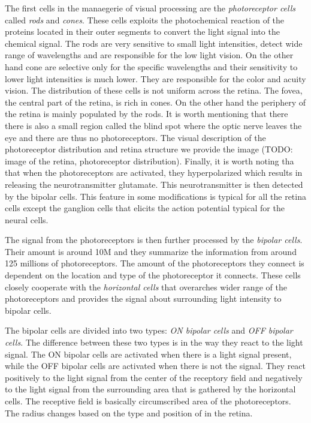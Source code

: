 The first cells in the manaegerie of visual processing are the \emph{photoreceptor cells}
called \emph{rods} and \emph{cones}. These cells exploits the photochemical reaction of the 
proteins located in their outer segments to convert the light signal into the
chemical signal. The rods are very sensitive to small light intensities, 
detect wide range of wavelengths and are responsible for the low light vision.
On the other hand cone are selective only for the specific wavelengths and their
sensitivity to lower light intensities is much lower. They are responsible for the
color and acuity vision. The distribution of these cells is not uniform across
the retina. The fovea, the central part of the retina, is rich in cones. On the other
hand the periphery of the retina is mainly populated by the rods. It is worth
mentioning that there there is also a small region called the blind spot where
the optic nerve leaves the eye and there are thus no photoreceptors. The 
visual description of the photoreceptor distribution and retina structure we
provide the image (TODO: image of the retina, photoreceptor distribution). Finally,
it is worth noting tha that when the photoreceptors are activated, they hyperpolarized
which results in releasing the neurotransmitter glutamate. This neurotransmitter
is then detected by the bipolar cells. This feature in some modifications is 
typical for all the retina cells except the ganglion cells that elicits the 
action potential typical for the neural cells.

The signal from the photoreceptors is then further processed by the 
\emph{bipolar cells}. Their amount is around 10M and they summarize the 
information from around 125 millions of photoreceptors. The amount of the 
photoreceptors they connect is dependent on the location and type of the 
photoreceptor it connects. These cells closely cooperate with the 
\emph{horizontal cells} that overarches wider range of the photoreceptors
and provides the signal about surrounding light intensity to bipolar cells.

The bipolar cells are divided into two types: \emph{ON bipolar cells} and 
\emph{OFF bipolar cells}. The difference between these two types is in the 
way they react to the light signal. The ON bipolar cells are activated when there
is a light signal present, while the OFF bipolar cells are activated when there is not
the signal. They react positively to the light signal from the center of the receptory
field and negatively to the light signal from the surrounding area that is gathered by the
horizontal cells. The receptive field is basically circumscribed area of the photoreceptors. The 
radius changes based on the type and position of in the retina.

